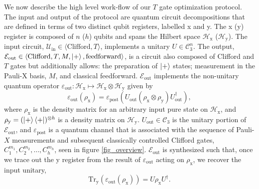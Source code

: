 \documentclass[notitlepage]{article}
\theoremstyle{definition}
\theoremstyle{problem}
\theoremstyle{lemma}
\begin{document}
We now describe the high level work-flow of our $T$ gate optimization protocol.
The input and output of the protocol are quantum circuit decompositions that are defined in terms of two distinct qubit registers, labelled x and y. The x (y) register is composed of $n$ ($h$) qubits and spans the Hilbert space $\mathcal{H}_{\text{x}}$ ($\mathcal{H}_{\text{y}}$). The input circuit, $\mathcal{U}_{\text{in}} \in \langle \mathrm{Clifford}, T \rangle$, implements a unitary $U \in \mathcal{C}_3^n$. The output, $\mathcal{E}_{\text{out}}  \in \langle \mathrm{Clifford}, T, M, \left\vert{+}\right\rangle, \mathrm{feedforward} \rangle $, is a circuit also composed of Clifford and $T$ gates but additionally allows: the preparation of $\left\vert{+}\right\rangle$ states; measurement in the Pauli-X basis, $M$, and classical feedforward. $\mathcal{E}_{\text{out}}$ implements the non-unitary quantum operator $\varepsilon_{\text{out}}:\mathcal{H}_{\text{x}} \mapsto \mathcal{H}_{\text{x}}\otimes \mathcal{H}_{\text{y}}$ given by
\begin{equation}
\label{e_out_1}
\varepsilon_{\text{out}}(\rho_{\text{x}}) = \varepsilon_{\text{post}}(U_{\text{out}}(\rho_{\text{x}}\otimes\rho_{\text{y}})U_{\text{out}}^\dagger),
\end{equation}
where $\rho_{\text{x}}$ is the density matrix for an arbitrary input pure state on $\mathcal{H}_\text{x}$, and $\rho_{\text{y}}=(\left\vert{+}\right\rangle\left\langle{+}\right\vert)^{\otimes h}$ is a density matrix on  $\mathcal{H}_\text{y}$. $U_{\text{out}}\in \mathcal{C}_3$ is the unitary portion of $\mathcal{E}_{\text{out}}$, and $\varepsilon_{\text{post}}$ is a quantum channel that is associated with the sequence of Pauli-$X$ measurements and subsequent classically controlled Clifford gates, $C_1^{m_1},C_2^{m_2},\dots,C_h^{m_h}$, seen in figure \ref{fig_overview}. $\mathcal{E}_{\text{out}}$ is synthesized such that, once we trace out the y register from the result of $\varepsilon_{\text{out}}$ acting on $\rho_{\text{x}}$, we recover the input unitary,
\begin{equation}
\label{e_out_2}
\mathrm{Tr}_{\text{y}}(\varepsilon_{\text{out}}(\rho_{\text{x}})) = U\rho_{\text{x}}U^\dagger.
\end{equation}
\end{document}
